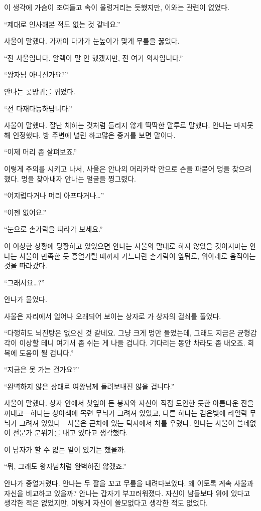 이 생각에 가슴이 조여들고 속이 울렁거리는 듯했지만, 이와는 관련이 없었다.

``제대로 인사해본 적도 없는 것 같네요.''

사울이 말했다. 가까이 다가가 눈높이가 맞게 무릎을 꿇었다.

``전 사울입니다. 알렉이 말 안 했겠지만, 전 여기 의사입니다.''

``왕자님 아니신가요?''

안나는 콧방귀를 뀌었다.

``전 다재다능하답니다.''

사울이 말했다. 잘난 체하는 것처럼 들리지 않게 딱딱한 말투로 말했다. 안나는 마지못해 인정했다. 방 주변에 널린 하고많은 증거를 보면 말이다.

``이제 머리 좀 살펴보죠.''

이렇게 주의를 시키고 나서, 사울은 안나의 머리카락 안으로 손을 파묻어 멍을 찾으려 했다. 멍을 찾아내자 안나는 얼굴을 찡그렸다.

``어지럽다거나 머리 아프다거나\ldots''

``이젠 없어요.''

``눈으로 손가락을 따라가 보세요.''

이 이상한 상황에 당황하고 있었으면 안나는 사울의 말대로 하지 않았을 것이지마는 안나는 사울이 만족한 듯 흥얼거릴 때까지 가느다란 손가락이 앞뒤로, 위아래로 움직이는 것을 따라갔다.

``그래서요\ldots?''

안나가 물었다.

사울은 자리에서 일어나 오래되어 보이는 상자로 가 상자의 걸쇠를 풀었다.

``다행히도 뇌진탕은 없으신 것 같네요. 그냥 크게 멍만 들었는데, 그래도 지금은 균형감각이 이상할 테니 여기서 좀 쉬는 게 나을 겁니다. 기다리는 동안 차라도 좀 내오죠. 회복에 도움이 될 겁니다.''

``지금은 못 가는 건가요?''

``완벽하지 않은 상태로 여왕님께 돌려보내진 않을 겁니다.''

사울이 말했다. 상자 안에서 찻잎이 든 봉지와 자신이 직접 도안한 듯한 아름다운 잔을 꺼내고—하나는 상아색에 목련 무늬가 그려져 있었고, 다른 하나는 검은빛에 라일락 무늬가 그려져 있었다—사울은 근처에 있는 탁자에서 차를 우렸다. 안나는 사울이 쓸데없이 전문가 분위기를 내고 있다고 생각했다.

이 남자가 할 수 없는 일이 있기는 했을까.

``뭐, 그래도 왕자님처럼 완벽하진 않겠죠.''

안나가 중얼거렸다. 안나는 두 팔을 꼬고 무릎을 내려다보았다. 왜 이토록 계속 사울과 자신을 비교하고 있을까? 안나는 갑자기 부끄러워졌다. 자신이 남들보다 위에 있다고 생각한 적은 없었지만, 이렇게 자신이 쓸모없다고 생각한 적도 없었다.

